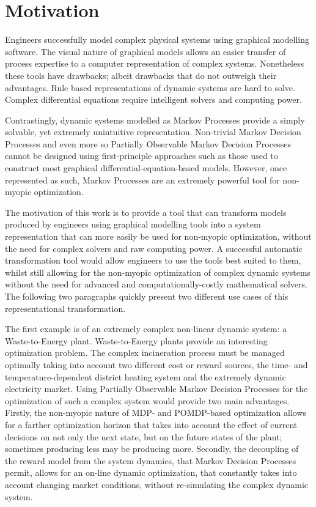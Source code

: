 \chapter{Motivation}

Engineers successfully model complex physical systems using graphical modelling software. The visual nature of graphical models allows an easier transfer of process expertise to a computer representation of complex systems. Nonetheless these tools have drawbacks; albeit drawbacks that do not outweigh their advantages. Rule based representations of dynamic systems are hard to solve. Complex differential equations require intelligent solvers and computing power.

Contrastingly, dynamic systems modelled as Markov Processes provide a simply solvable, yet extremely unintuitive representation. Non-trivial Markov Decision Processes and even more so Partially Observable Markov Decision Processes cannot be designed using first-principle approaches such as those used to construct most graphical differential-equation-based models. However, once represented as such, Markov Processes are an extremely powerful tool for non-myopic optimization.

The motivation of this work is to provide a tool that can transform models produced by engineers using graphical modelling tools into a system representation that can more easily be used for non-myopic optimization, without the need for complex solvers and raw computing power. A successful automatic transformation tool would allow engineers to use the tools best suited to them, whilst still allowing for the non-myopic optimization of complex dynamic systems without the need for advanced and computationally-costly mathematical solvers. The following two paragraphs quickly present two different use cases of this representational transformation.

The first example is of an extremely complex non-linear dynamic system: a Waste-to-Energy plant. Waste-to-Energy plants provide an interesting optimization problem. The complex incineration process must be managed optimally taking into account two different cost or reward sources, the time- and temperature-dependent district heating system and the extremely dynamic electricity market. Using Partially Observable Markov Decision Processes for the optimization of such a complex system would provide two main advantages. Firstly, the non-myopic nature of MDP- and POMDP-based optimization allows for a farther optimization horizon that takes into account the effect of current decisions on not only the next state, but on the future states of the plant; sometimes producing less may be producing more. Secondly, the decoupling of the reward model from the system dynamics, that Markov Decision Processes permit, allows for an on-line dynamic optimization, that constantly takes into account changing market conditions, without re-simulating the complex dynamic system.

